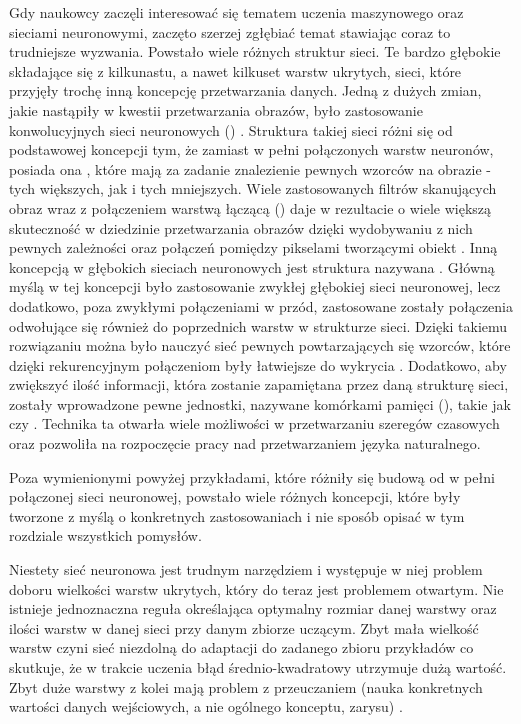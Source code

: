 Gdy naukowcy zaczęli interesować się tematem uczenia maszynowego oraz sieciami neuronowymi, zaczęto szerzej zgłębiać temat stawiając coraz to trudniejsze wyzwania. Powstało wiele różnych struktur sieci. Te bardzo głębokie składające się z kilkunastu, a nawet kilkuset warstw ukrytych, sieci, które przyjęły trochę inną koncepcję przetwarzania danych. Jedną z dużych zmian, jakie nastąpiły w kwestii przetwarzania obrazów, było zastosowanie konwolucyjnych sieci neuronowych () \cite{CNN}. Struktura takiej sieci różni się od podstawowej koncepcji tym, że zamiast w pełni połączonych warstw neuronów, posiada ona , które mają za zadanie znalezienie pewnych wzorców na obrazie - tych większych, jak i tych mniejszych. Wiele zastosowanych filtrów skanujących obraz wraz z połączeniem warstwą łączącą () daje w rezultacie o wiele większą skuteczność w dziedzinie przetwarzania obrazów dzięki wydobywaniu z nich pewnych zależności oraz połączeń pomiędzy pikselami tworzącymi obiekt \cite{Prezentacja:KKCNN} \cite{Prezentacja:CNNintro}.
Inną koncepcją w głębokich sieciach neuronowych jest struktura nazywana  \cite{Prezentacja:KKRNN}. Główną myślą w tej koncepcji było zastosowanie zwykłej głębokiej sieci neuronowej, lecz dodatkowo, poza zwykłymi połączeniami w przód, zastosowane zostały połączenia odwołujące się również do poprzednich warstw w strukturze sieci. Dzięki takiemu rozwiązaniu można było nauczyć sieć pewnych powtarzających się wzorców, które dzięki rekurencyjnym połączeniom były łatwiejsze do wykrycia \cite{Geron}. Dodatkowo, aby zwiększyć ilość informacji, która zostanie zapamiętana przez daną strukturę sieci, zostały wprowadzone pewne jednostki, nazywane komórkami pamięci (), takie jak  \cite{LSTM} czy  \cite{GRU}. Technika ta otwarła wiele możliwości w przetwarzaniu szeregów czasowych oraz pozwoliła na rozpoczęcie pracy nad przetwarzaniem języka naturalnego.

Poza wymienionymi powyżej przykładami, które różniły się budową od w pełni połączonej sieci neuronowej, powstało wiele różnych koncepcji, które były tworzone z myślą o konkretnych zastosowaniach i nie sposób opisać w tym rozdziale wszystkich pomysłów.

Niestety sieć neuronowa jest trudnym narzędziem i występuje w niej problem doboru wielkości warstw ukrytych, który do teraz jest problemem otwartym. 
Nie istnieje jednoznaczna reguła określająca optymalny rozmiar danej warstwy oraz ilości warstw w danej sieci przy danym zbiorze uczącym. Zbyt mała wielkość warstw czyni sieć niezdolną do adaptacji do
zadanego zbioru przykładów co skutkuje, że w trakcie uczenia błąd
średnio-kwadratowy utrzymuje dużą wartość. Zbyt duże warstwy z kolei mają problem z przeuczaniem (nauka konkretnych wartości danych wejściowych, a nie ogólnego konceptu, zarysu) \cite{Prezentacja:SNN}.

